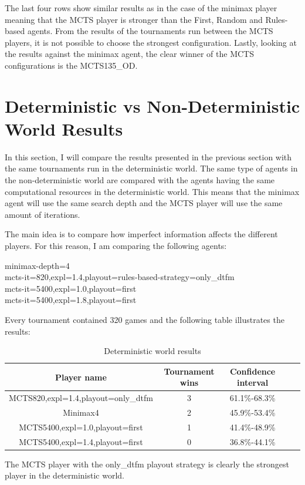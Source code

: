 The last four rows show similar results as in the case of the minimax player meaning that the MCTS player is stronger than the 
First, Random and Rules-based agents. From the results of the tournaments run between the MCTS players, it is not possible
to choose the strongest configuration. Lastly, looking at the results against the minimax agent, the clear winner of the MCTS
configurations is the MCTS135\_OD.

\section{Deterministic vs Non-Deterministic World Results}

In this section, I will compare the results presented in the previous section with the same tournaments run in the deterministic world.
The same type of agents in the non-deterministic world are compared with the agents having the same computational resources in the 
deterministic world. This means that the minimax agent will use the same search depth and the MCTS player will use the same amount of iterations.

The main idea is to compare how imperfect information affects the different players. For this reason, I am comparing the following agents:

\begin{description}
    \item[minimax-depth=4]
    \item[mcts-it=820,expl=1.4,playout=rules-based-strategy=only\_dtfm]
    \item[mcts-it=5400,expl=1.0,playout=first]
    \item[mcts-it=5400,expl=1.8,playout=first]
\end{description}

Every tournament contained 320 games and the following table illustrates the results:

\begin{table}[H] 
    \centering
    \begin{tabular}{|c|c|c|c|c|} 
        \hline
        \textbf{Player name} & \textbf{Tournament wins} & \textbf{Confidence interval} \\ \hline
        MCTS820,expl=1.4,playout=only\_dtfm & 3 & 61.1\%-68.3\% \\ \hline
        Minimax4 & 2 & 45.9\%-53.4\% \\ \hline
        MCTS5400,expl=1.0,playout=first & 1 & 41.4\%-48.9\% \\ \hline
        MCTS5400,expl=1.4,playout=first & 0 & 36.8\%-44.1\% \\ \hline
    
    \end{tabular}
    \caption{Deterministic world results}
\end{table}

The MCTS player with the only\_dtfm playout strategy is clearly the strongest player in the deterministic world.